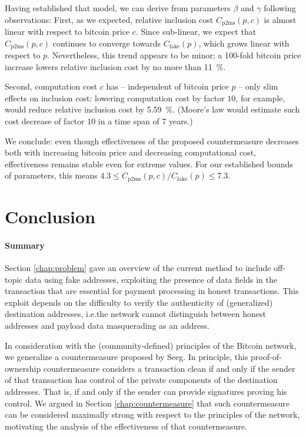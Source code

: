 \documentclass[a4paper,11pt,titlepage]{scrbook}
\begin{document}
Having established that model, we can derive from parameters $\beta$ and $\gamma$ following observations:
First, as we expected, relative inclusion cost $C_\mathrm{p2ms}(p,c)$ is almost linear with respect to bitcoin price $c$.
Since sub-linear, we expect that $C_\mathrm{p2ms}(p,c)$ continues to converge towards $C_\mathrm{fake}(p)$, which grows linear with respect to $p$.
Nevertheless, this trend appears to be minor; a 100-fold bitcoin price increase lowers relative inclusion cost by no more than \SI{11}{\percent}.

Second, computation cost $c$ has – independent of bitcoin price $p$ – only slim effects on inclusion cost: lowering computation cost by factor $10$, for example, would reduce relative inclusion cost by \SI{5.59}{\percent}. (Moore's law would estimate such cost decrease of factor $10$ in a time span of 7 years.)

We conclude: even though effectiveness of the proposed countermeasure decreases both with increasing bitcoin price and decreasing computational cost, effectiveness remains stable even for extreme values.
For our established bounds of parameters, this means $\num{4.3} \leq C_\mathrm{p2ms}(p,c) / C_\mathrm{fake}(p) \leq \num{7.3}$.


\chapter{Conclusion}\label{chap:conclusion}

\subsubsection*{Summary}

Section \ref{chap:problem} gave an overview of the current method to include off-topic data using fake addresses, exploiting the presence of data fields in the transaction that are essential for payment processing in honest transactions.
This exploit depends on the difficulty to verify the authenticity of (generalized) destination addresses, i.e.\@ the network cannot distinguish between honest addresses and payload data masquerading as an address.

In consideration with the (community-defined) principles of the Bitcoin network, we generalize a countermeasure proposed by Seeg.
In principle, this proof-of-ownership countermeasure considers a transaction clean if and only if the sender of that transaction has control of the private components of the destination addresses.
That is, if and only if the sender can provide signatures proving his control.
We argued in Section \ref{chap:countermeasure} that such countermeasure can be considered maximally strong with respect to the principles of the network, motivating the analysis of the effectiveness of that countermeasure.
\end{document}
